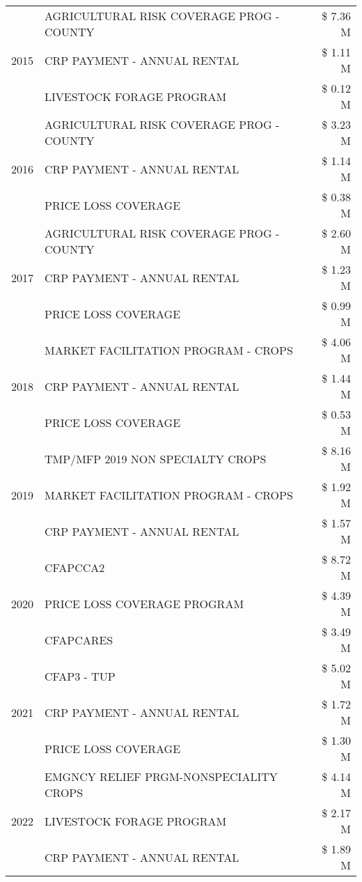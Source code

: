 \begin{tabular}{llr}
\cline{1-3}
\multirow[t]{3}{*}{2015} & AGRICULTURAL RISK COVERAGE PROG - COUNTY & \$ 7.36 M \\
 & CRP PAYMENT - ANNUAL RENTAL & \$ 1.11 M \\
 & LIVESTOCK FORAGE PROGRAM & \$ 0.12 M \\
\cline{1-3}
\multirow[t]{3}{*}{2016} & AGRICULTURAL RISK COVERAGE PROG - COUNTY & \$ 3.23 M \\
 & CRP PAYMENT - ANNUAL RENTAL & \$ 1.14 M \\
 & PRICE LOSS COVERAGE & \$ 0.38 M \\
\cline{1-3}
\multirow[t]{3}{*}{2017} & AGRICULTURAL RISK COVERAGE PROG - COUNTY & \$ 2.60 M \\
 & CRP PAYMENT - ANNUAL RENTAL & \$ 1.23 M \\
 & PRICE LOSS COVERAGE & \$ 0.99 M \\
\cline{1-3}
\multirow[t]{3}{*}{2018} & MARKET FACILITATION PROGRAM - CROPS & \$ 4.06 M \\
 & CRP PAYMENT - ANNUAL RENTAL & \$ 1.44 M \\
 & PRICE LOSS COVERAGE & \$ 0.53 M \\
\cline{1-3}
\multirow[t]{3}{*}{2019} & TMP/MFP 2019 NON SPECIALTY CROPS & \$ 8.16 M \\
 & MARKET FACILITATION PROGRAM - CROPS & \$ 1.92 M \\
 & CRP PAYMENT - ANNUAL RENTAL & \$ 1.57 M \\
\cline{1-3}
\multirow[t]{3}{*}{2020} & CFAPCCA2 & \$ 8.72 M \\
 & PRICE LOSS COVERAGE PROGRAM & \$ 4.39 M \\
 & CFAPCARES & \$ 3.49 M \\
\cline{1-3}
\multirow[t]{3}{*}{2021} & CFAP3 - TUP & \$ 5.02 M \\
 & CRP PAYMENT - ANNUAL RENTAL & \$ 1.72 M \\
 & PRICE LOSS COVERAGE & \$ 1.30 M \\
\cline{1-3}
\multirow[t]{3}{*}{2022} & EMGNCY RELIEF PRGM-NONSPECIALITY CROPS & \$ 4.14 M \\
 & LIVESTOCK FORAGE PROGRAM & \$ 2.17 M \\
 & CRP PAYMENT - ANNUAL RENTAL & \$ 1.89 M \\
\cline{1-3}
\bottomrule
\end{tabular}
